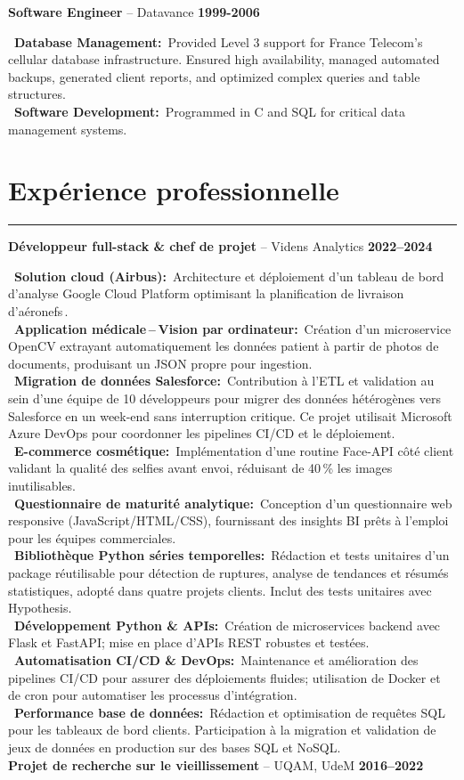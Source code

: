 \documentclass[a4paper,10pt]{article}
\newif\ifpandocconvert
\newcommand{\resumeSection}[2]{%
  \ifpandocconvert %
    \par\addvspace{1em}\noindent\textbf{#1}\par\addvspace{0.5em}%
    #2%
    \par\addvspace{0.3em}%
  \else %
    \section*{#1}%
    \vspace{-2em} %
    \noindent\rule{\textwidth}{0.4pt}%
    \vspace{0.5em} %
    #2%
    \vspace{0.3em}%
  \fi
}
\newcommand{\resumeItem}[3]{%
  \noindent\textbf{#1} -- #2 \hfill \textbf{#3} \\
  \vspace{0.3em}
}
\newcommand{\jobItem}[2]{%
  \noindent
  \textbullet\ \textbf{#1\ifthenelse{\boolean{EN}}{}{ }:}~#2\vspace{0.3em} \\
}
\begin{document}
{{    \vspace{1em}
    \resumeItem{Software Engineer}{Datavance}{1999-2006}
    \jobItem{Database Management}{Provided Level 3 support for France Telecom's cellular database infrastructure. Ensured high availability, managed automated backups, generated client reports, and optimized complex queries and table structures.}
    \jobItem{Software Development}{Programmed in C and SQL for critical data management systems.}
  }
}{%
  \resumeSection{Expérience professionnelle}{
    \resumeItem{Développeur full-stack \& chef de projet}{Videns Analytics}{2022–2024}
    \jobItem{Solution cloud (Airbus)}{Architecture et déploiement d'un tableau de bord d'analyse Google Cloud Platform optimisant la planification de livraison d'aéronefs .}
    \jobItem{Application médicale – Vision par ordinateur}{Création d'un microservice OpenCV extrayant automatiquement les données patient à partir de photos de documents, produisant un JSON propre pour ingestion.}
    \jobItem{Migration de données Salesforce}{Contribution à l'ETL et validation au sein d'une équipe de 10 développeurs pour migrer des données hétérogènes vers Salesforce en un week-end sans interruption critique. Ce projet utilisait Microsoft Azure DevOps pour coordonner les pipelines CI/CD et le déploiement.}
    \jobItem{E-commerce cosmétique}{Implémentation d'une routine Face-API côté client validant la qualité des selfies avant envoi, réduisant de 40\,\% les images inutilisables.}
    \jobItem{Questionnaire de maturité analytique}{Conception d'un questionnaire web responsive (JavaScript/HTML/CSS), fournissant des insights BI prêts à l'emploi pour les équipes commerciales.}
    \jobItem{Bibliothèque Python séries temporelles}{Rédaction et tests unitaires d'un package réutilisable pour détection de ruptures, analyse de tendances et résumés statistiques, adopté dans quatre projets clients. Inclut des tests unitaires avec Hypothesis.}
    \jobItem{Développement Python \& APIs}{Création de microservices backend avec Flask et FastAPI; mise en place d’APIs REST robustes et testées.}
    \jobItem{Automatisation CI/CD \& DevOps}{Maintenance et amélioration des pipelines CI/CD pour assurer des déploiements fluides; utilisation de Docker et de cron pour automatiser les processus d’intégration.}
    \jobItem{Performance base de données}{Rédaction et optimisation de requêtes SQL pour les tableaux de bord clients. Participation à la migration et validation de jeux de données en production sur des bases SQL et NoSQL.}
    \vspace{1em}
    \resumeItem{Projet de recherche sur le vieillissement}{UQAM, UdeM}{2016–2022}
}}
\end{document}
